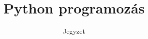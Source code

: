 \documentclass[12pt]{article}
\begin{document}
\title{Python programozás}
\author{Jegyzet}
\date{}
\maketitle

\clearpage

\tableofcontents

\clearpage




\end{document}
